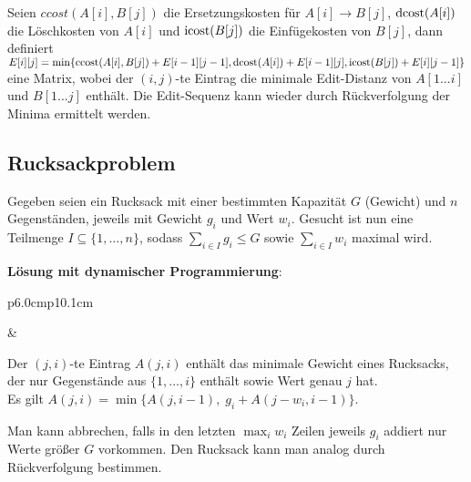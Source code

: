 Seien $ccost(A[i], B[j])$ die Ersetzungskosten für $A[i] \rightarrow B[j]$,
$\operatorname{dcost}(A[i])$ die Löschkosten von $A[i]$ und
$\operatorname{icost}(B[j])$ die Einfügekosten von $B[j]$, dann definiert \\
$E[i][j] = \min\{\operatorname{ccost}(A[i], B[j]) + E[i - 1][j - 1],
\operatorname{dcost}(A[i]) + E[i - 1][j],
\operatorname{icost}(B[j]) + E[i][j - 1]\}$ \\
eine Matrix, wobei der $(i, j)$-te Eintrag die minimale Edit-Distanz
von $A[1 ... i]$ und $B[1 ... j]$ enthält.
Die Edit-Sequenz kann wieder durch Rückverfolgung der Minima ermittelt werden.

\subsection{%
    Rucksackproblem%
}

Gegeben seien ein Rucksack mit einer bestimmten Kapazität $G$ (Gewicht) und
$n$ Gegenständen, jeweils mit Gewicht $g_i$ und Wert $w_i$.
Gesucht ist nun eine Teilmenge $I \subseteq \{1, \dotsc, n\}$, sodass
$\sum_{i \in I} g_i \le G$ sowie $\sum_{i \in I} w_i$ maximal wird.

\linie

\textbf{Lösung mit dynamischer Programmierung}: \\
\begin{tabular}{p{6.0cm}p{10.1cm}}
    \begin{minipage}[c]{6.0cm}
    \end{minipage} &
    \begin{minipage}[c]{10.1cm}
        Der $(j, i)$-te Eintrag $A(j, i)$ enthält das minimale Gewicht
        eines Rucksacks, der nur Gegenstände aus $\{1, \dotsc, i\}$ enthält
        sowie Wert genau $j$ hat. \\
        Es gilt
        $A(j, i) = \min\{A(j, i - 1),\; g_i + A(j - w_i, i - 1)\}$.
    \end{minipage}
\end{tabular}

Man kann abbrechen, falls in den letzten $\max_i w_i$ Zeilen jeweils
$g_i$ addiert nur Werte größer $G$ vorkommen.
Den Rucksack kann man analog durch Rückverfolgung bestimmen.

\pagebreak
